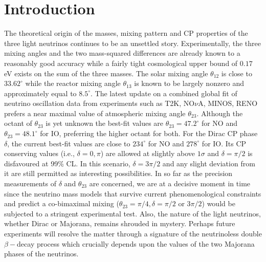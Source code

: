 \documentclass[11pt]{article}
\begin{document}
\section{Introduction} The theoretical origin of the masses, mixing pattern and CP properties\cite{King:2015aea} of the three light neutrinos continues to be an unsettled story. Experimentally, the three mixing angles and the two mass-squared differences are already known to a reasonably good accuracy while a fairly tight cosmological upper bound\cite{Aghanim:2016yuo} of $0.17$ eV exists on the sum of the three masses. The solar mixing angle $\theta_{12}$ is close to $33.62^\circ$ while the reactor mixing angle $\theta_{13}$ is known to be largely nonzero and approximately equal to $8.5^\circ$. The latest update on a combined global fit of neutrino oscillation data from experiments such as T2K\cite{Abe:2017bay}, NO$\nu$A\cite{Adamson:2017qqn}, MINOS\cite{minos}, RENO\cite{reno} prefers a near maximal value of atmospheric mixing angle $\theta_{23}$. Although the octant of $\theta_{23}$ is yet unknown the best-fit values are $\theta_{23}=47.2^\circ$ for NO and $\theta_{23}=48.1^\circ$ for IO, preferring the higher octant for both. For the Dirac CP phase $\delta$, the current best-fit values are close to $234^\circ$ for NO and $278^\circ$ for IO. Its CP conserving values (i.e., $\delta=0,\pi$) are allowed at slightly above $1\sigma$ and $\delta=\pi/2$ is disfavoured at 99\% CL\cite{Esteban:2016qun}. In this scenario, $\delta=3\pi/2$ and any slight deviation from it are still permitted as interesting possibilities. In so far as the precision measurements of $\delta$ and $\theta_{23}$ are concerned, we are at a decisive moment in time since the neutrino mass models that survive current phenomenological constraints and predict a co-bimaximal mixing ($\theta_{23}=\pi/4, \delta=\pi/2$ or $3\pi/2$)\cite{Grimus:2003yn} would be subjected to a stringent experimental test. Also, the nature of the light neutrinos, whether Dirac or Majorana, remains shrouded in mystery. Perhaps future experiments will resolve the matter through a signature of the neutrinoless double $\beta-$decay process which crucially depends upon the values of the two Majorana phases of the neutrinos.
\end{document}
